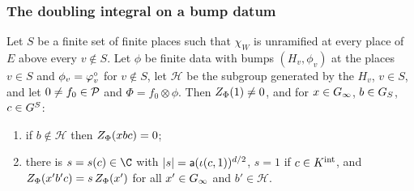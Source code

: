 \subsubsection*{The doubling integral on a bump datum}
\begin{proposition}\label{pf:tlift:datum}
Let $S$ be a finite set of finite places such that $\chi_W$ is unramified at every place of $E$ above every
$v\notin S$. Let $\phi$ be finite data with bumps $(H_v,\phi_v)$ at the places $v\in S$ and $\phi_v=\varphi^{\circ}_v$ for $v\notin S$,
let $\mathcal H$ be the subgroup generated by the $H_v$, $v\in S$, and let $0\ne f_0\in\mathcal{P}$ and $\Phi=f_0\otimes\phi$. Then
$Z_\Phi(1)\ne0$, and for $x\in G_\infty$, $b\in G_S$, $c\in G^{S}$:
\begin{enumerate}[label=(\alph*),nosep]
\item if $b\notin\mathcal H$ then $Z_\Phi(xbc)=0$;
\item there is $s=s(c)\in\C$ with $|s|=\mathsf{a}(\iota(c,1))^{d/2}$, $s=1$ if $c\in K^{\mathrm{int}}$, and
  $Z_\Phi(x'b'c)=s\,Z_\Phi(x')$ for all $x'\in G_\infty$ and $b'\in\mathcal H$.
\end{enumerate}
\end{proposition}

